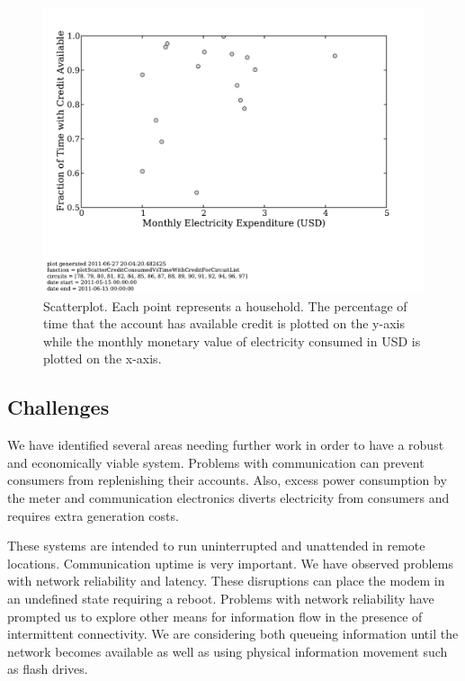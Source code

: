 \documentclass{sig-alternate}
\newcommand{\note}[1]{{\color{red} NOTE: *** #1 ***}}
\begin{document}
\begin{figure}[]
\begin{center}
\includegraphics[trim = 0in 1.3in 0in 0in, clip, width=\columnwidth]
                {figures/scatterCreditTime.pdf}
\end{center}
\caption{Scatterplot.  Each point represents a household.  The percentage
of time that the account has available credit is plotted on the y-axis while
the monthly monetary value of electricity consumed in USD is plotted on the x-axis.}
\label{scatterCreditTime}
\end{figure}


\subsection{Challenges}
We have identified several areas needing further work in order to have
a robust and economically viable system.  Problems with communication
can prevent consumers from replenishing their accounts.  Also, excess
power consumption by the meter and communication electronics diverts
electricity from consumers and requires extra generation costs.

These systems are intended to run uninterrupted and unattended in
remote locations.  Communication uptime is very important.  We have
observed problems with network reliability and latency.
These disruptions can
place the modem in an undefined state requiring a reboot.
Problems with network reliability have prompted us to explore other
means for information flow in the presence of intermittent connectivity.
We are considering both queueing information until the network becomes
available as well as using physical information movement such as flash
drives.
\end{document}
